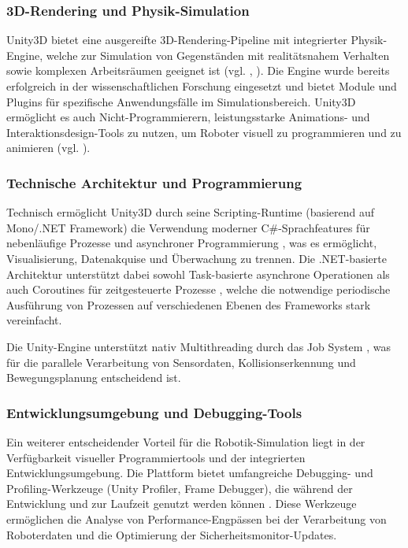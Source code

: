 \subsubsection{3D-Rendering und Physik-Simulation}

Unity3D bietet eine ausgereifte 3D-Rendering-Pipeline mit integrierter
Physik-Engine, welche zur Simulation von Gegenständen mit realitätsnahem
Verhalten sowie komplexen Arbeitsräumen geeignet ist (vgl.
\citet{Unity2025SystemRequirements}, \citet{Unity2025PhysicsOverview}). Die
Engine wurde bereits erfolgreich in der wissenschaftlichen Forschung eingesetzt
und bietet Module und Plugins für spezifische Anwendungsfälle im
Simulationsbereich. Unity3D ermöglicht es auch Nicht-Programmierern,
leistungsstarke Animations- und Interaktionsdesign-Tools zu nutzen, um Roboter
visuell zu programmieren und zu animieren (vgl. \cite[S. 431]{bartneck2015}).

\subsubsection{Technische Architektur und Programmierung}

Technisch ermöglicht Unity3D durch seine Scripting-Runtime (basierend auf
Mono/.NET Framework) die Verwendung moderner C\#-Sprachfeatures für
nebenläufige Prozesse und asynchroner Programmierung
\cite[S.~45-52]{unity_async_2023}, was es ermöglicht, Visualisierung,
Datenakquise und Überwachung zu trennen. Die .NET-basierte Architektur
unterstützt dabei sowohl Task-basierte asynchrone Operationen als auch
Coroutines für zeitgesteuerte Prozesse
\cite[S.~123-135]{unity_coroutines_2023}, welche die notwendige periodische
Ausführung von Prozessen auf verschiedenen Ebenen des Frameworks stark
vereinfacht.

Die Unity-Engine unterstützt nativ Multithreading durch das Job System
\cite[S.~201-218]{unity_jobsystem_2023}, was für die parallele Verarbeitung von
Sensordaten, Kollisionserkennung und Bewegungsplanung entscheidend ist.

\subsubsection{Entwicklungsumgebung und Debugging-Tools}

Ein weiterer entscheidender Vorteil für die Robotik-Simulation liegt in der
Verfügbarkeit visueller Programmiertools und der integrierten
Entwicklungsumgebung. Die Plattform bietet umfangreiche Debugging- und
Profiling-Werkzeuge (Unity Profiler, Frame Debugger), die während der
Entwicklung und zur Laufzeit genutzt werden können
\cite[S.~67-89]{unity_profiler_2023}. Diese Werkzeuge ermöglichen die Analyse
von Performance-Engpässen bei der Verarbeitung von Roboterdaten und die
Optimierung der Sicherheitsmonitor-Updates.

